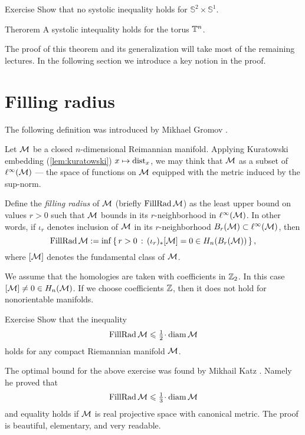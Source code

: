 \begin{thm}{Exercise}\label{ex:sysS2xS1}
Show that no systolic inequality holds for $\mathbb{S}^2\times\mathbb{S}^1$.
\end{thm}


\begin{thm}{Therorem}\label{thm:sys(torus)}
A systolic intequality holds for the torus $\mathbb{T}^n$. 
\end{thm}

The proof of this theorem and its generalization will take most of the remaining lectures.
In the following section we introduce a key notion in the proof.

\section{Filling radius}

The following definition was introduced by Mikhael Gromov \cite{gromov-1983}.

Let $\mathcal{M}$ be a closed $n$-dimensional Reimannian manifold.
Applying Kuratowski embedding (\ref{lem:kuratowski}) $x\mapsto \mathrm{dist}_x$, we may think that $\mathcal{M}$ as a subset of $\ell^\infty(\mathcal{M})$ --- the space of functions on $\mathcal{M}$ equipped with the metric induced by the sup-norm.

Define the \emph{filling radius} of $\mathcal{M}$ (briefly $\operatorname{\rm FillRad}\mathcal{M}$) as the least upper bound on values $r>0$ such that $\mathcal{M}$ bounds in its $r$-neighborhood in $\ell^\infty(\mathcal{M})$.
In other words, if $\iota_r$ denotes inclusion of $\mathcal{M}$ in its $r$-neighborhood $B_r(\mathcal{M})\subset \ell^\infty(\mathcal{M})$,
then 
\[\operatorname{\rm FillRad}\mathcal{M}\mathrel{:=}\inf\left\{\,{r>0}\,:\,{(\iota_r)_*[\mathcal{M}]=0\in H_n(B_r(\mathcal{M}))}\,\right\},\]
where $[\mathcal{M}]$ denotes the fundamental class of $\mathcal{M}$.

We assume that the homologies are taken with coefficients in $\mathbb{Z}_2$.
In this case $[\mathcal{M}]\ne0\in H_n(\mathcal{M})$.
If we choose coefficients $\mathbb{Z}$, then it does not hold for nonorientable manifolds.


\begin{thm}{Exercise}\label{ex:fillrad<diam/2}
Show that the inequality
\[\FillRad \spc{M}\le \tfrac12\cdot\diam \spc{M}\]
holds for any compact Riemannian manifold $\mathcal{M}$.
\end{thm}

The optimal bound for the above exercise was found by Mikhail Katz \cite{katz}.
Namely he proved that
\[\FillRad \spc{M}\le \tfrac13\cdot\diam \spc{M}\]
and equality holds if $\mathcal{M}$ is real projective space with canonical metric.
The proof is beautiful, elementary, and very readable.

